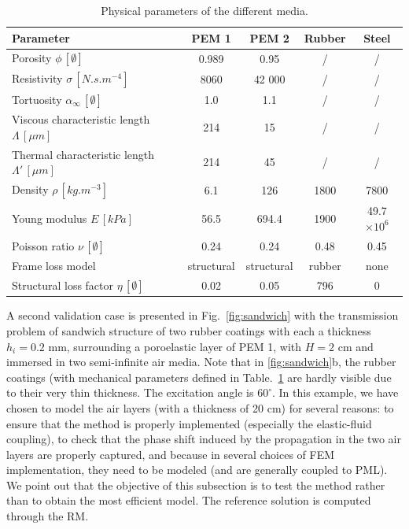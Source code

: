 \begin{table}[hbtp]
	\begin{center}
	\begin{tabular}{lcccc} 
	\hline
 \textbf{Parameter}&\textbf{PEM 1} & \textbf{PEM 2} & \textbf{Rubber} & \textbf{Steel}\\ 
 \hline
    Porosity $\phi \,[\emptyset]$   					& 0.989 & 0.95& / &/\\
    Resistivity $\sigma\,[ N.s.m^{-4}]$ 				& 8060 & 42 000&/ &/\\
    Tortuosity   $\alpha_\infty\,[\emptyset]$ & 1.0 & 1.1& /& /\\
    Viscous characteristic length  $\Lambda\,[\mu m]$ 			& 214 & 15& / &/\\
    Thermal characteristic length  $\Lambda'\,[\mu m]$ 			& 214  & 45& /&/\\
    Density	 $\rho\,[kg.m^{-3}]$ & 6.1 & 126 & 1800&7800\\
    Young modulus $E \,[kPa]$ & 56.5 & 694.4& 1900&49.7$\times 10^6$\\
    Poisson ratio $\nu \,[\emptyset]$ 					& 0.24&0.24&0.48&0.45 \\
    Frame loss model  &structural &structural &rubber&none\\
    Structural loss factor $\eta \,[\emptyset]$ 					& 0.02 & 0.05 &796&0\\
	\hline
	\end{tabular}
	\end{center}
	\caption{Physical parameters of the different media.}
	\label{tab:param_mat}
\end{table}

A second validation case is presented in Fig.~\ref{fig:sandwich} with the transmission problem of sandwich structure of two rubber coatings with each a thickness $h_i=0.2$ mm, surrounding a poroelastic layer of PEM 1,  with $H=2$ cm and immersed in two semi-infinite air media. Note that in \cref{fig:sandwich}b, the rubber coatings (with mechanical parameters defined in Table.~\ref{tab:param_mat} are hardly visible due to their very thin thickness. The excitation angle is $60^\circ$. In this example, we have chosen to model the air layers (with a thickness of 20 cm) for several reasons: to ensure that the method is properly implemented (especially the elastic-fluid coupling), to check that the phase shift induced by the propagation in the two air layers are properly captured, and because in several choices of FEM implementation, they need to be modeled (and are generally coupled to PML). We point out that the objective of this subsection is to test the method rather than to obtain the most efficient model. The reference solution is computed through the RM. \\


